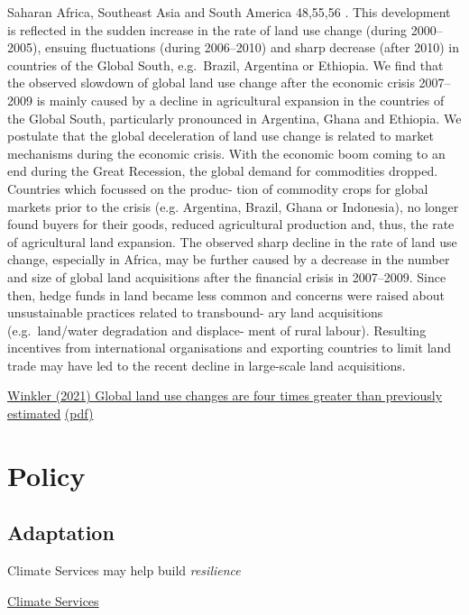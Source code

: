 \documentclass[
]{book}
\begin{document}
Saharan Africa, Southeast Asia and South America 48,55,56 . This
development is reflected in the sudden increase in the rate of land
use change (during 2000--2005), ensuing fluctuations (during
2006--2010) and sharp decrease (after 2010) in countries of the
Global South, e.g.~Brazil, Argentina or Ethiopia.
We find that the observed slowdown of global land
use change after the economic crisis 2007--2009 is mainly caused
by a decline in agricultural expansion in the countries of the
Global South, particularly pronounced in Argentina, Ghana and
Ethiopia. We postulate that the global
deceleration of land use change is related to market mechanisms
during the economic crisis. With the economic boom coming to
an end during the Great Recession, the global demand for
commodities dropped. Countries which focussed on the produc-
tion of commodity crops for global markets prior to the crisis (e.g.
Argentina, Brazil, Ghana or Indonesia), no longer found buyers
for their goods, reduced agricultural production and, thus, the
rate of agricultural land expansion. The observed sharp decline in
the rate of land use change, especially in Africa, may
be further caused by a decrease in the number and size of global
land acquisitions after the financial crisis in 2007--2009. Since
then, hedge funds in land became less common and concerns
were raised about unsustainable practices related to transbound-
ary land acquisitions (e.g.~land/water degradation and displace-
ment of rural labour). Resulting incentives from international
organisations and exporting countries to limit land trade may
have led to the recent decline in large-scale land acquisitions.

\href{https://www.nature.com/articles/s41467-021-22702-2}{Winkler (2021) Global land use changes are four times greater than previously estimated}
\href{pdf/Winkler_2021_LUC_4_times_greater.pdf}{(pdf)}

\hypertarget{part-policy}{%
\part{Policy}\label{part-policy}}

\hypertarget{adaptation}{%
\chapter{Adaptation}\label{adaptation}}

Climate Services may help build \emph{resilience}

\href{https://gfcs.wmo.int/}{Climate Services}
\end{document}
